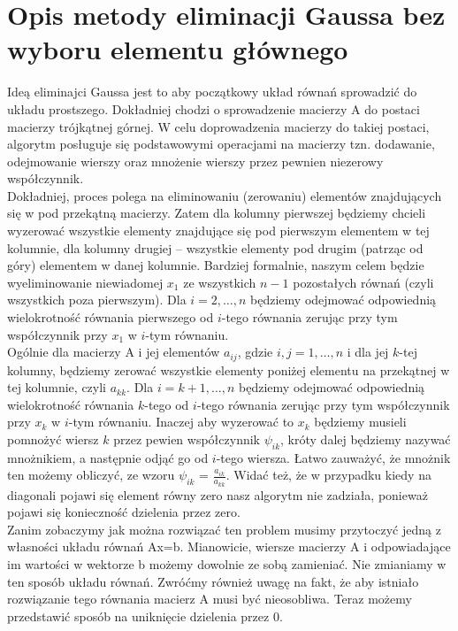 \documentclass[]{article}
\begin{document}
	\section*{Opis metody eliminacji Gaussa bez wyboru elementu głównego}
	Ideą eliminajci Gaussa jest to aby początkowy układ równań sprowadzić do układu prostszego. Dokładniej chodzi o sprowadzenie macierzy A do postaci macierzy trójkątnej górnej. W celu doprowadzenia macierzy do takiej postaci, algorytm posługuje się podstawowymi operacjami na macierzy tzn. dodawanie, odejmowanie wierszy oraz mnożenie wierszy przez pewnien niezerowy współczynnik. \\
	Dokładniej, proces polega na eliminowaniu (zerowaniu) elementów znajdujących się w pod przekątną macierzy.
	Zatem dla kolumny pierwszej będziemy chcieli wyzerować wszystkie elementy znajdujące się pod pierwszym elementem w tej kolumnie, dla kolumny drugiej -- wszystkie elementy pod drugim (patrząc od góry) elementem w danej kolumnie. Bardziej formalnie, naszym celem będzie wyeliminowanie niewiadomej $x_1$ ze wszystkich $n-1$ pozostałych równań (czyli wszystkich poza pierwszym). Dla $i = 2,\ldots,n$ będziemy odejmować odpowiednią wielokrotność równania pierwszego od $i$-tego równania zerując przy tym współczynnik przy $x_1$ w $i$-tym równaniu. \\
	Ogólnie dla macierzy A i jej elementów $a_{ij}$, gdzie $i,j = 1,\ldots,n$ i dla jej $k$-tej kolumny, będziemy zerować wszystkie elementy poniżej elementu na przekątnej w tej kolumnie, czyli $a_{kk}$. Dla $i = k+1,\ldots,n$ będziemy odejmować odpowiednią wielokrotność równania $k$-tego od $i$-tego równania zerując przy tym współczynnik przy $x_k$ w $i$-tym równaniu. Inaczej aby wyzerować to $x_k$ będziemy musieli pomnożyć wiersz $k$ przez pewien współczynnik $\psi_{ik}$, króty dalej będziemy nazywać mnożnikiem, a następnie odjąć go od $i$-tego wiersza. Łatwo zauważyć, że mnożnik ten możemy obliczyć, ze wzoru $\psi_{ik}$ = $\frac{a_{ik}}{a_{kk}}$. Widać też, że w przypadku kiedy na diagonali pojawi się element równy zero nasz algorytm nie zadziała, ponieważ pojawi się konieczność dzielenia przez zero. \\
	Zanim zobaczymy jak można rozwiązać ten problem musimy przytoczyć jedną z własności układu równań Ax=b. Mianowicie, wiersze macierzy A i odpowiadające im wartości w wektorze b możemy dowolnie ze sobą zamieniać. Nie zmianiamy w ten sposób układu równań.
	Zwróćmy również uwagę na fakt, że aby istniało rozwiązanie tego równania macierz A musi być nieosobliwa. 
	Teraz możemy przedstawić sposób na uniknięcie dzielenia przez 0. 
	\clearpage
\end{document}
